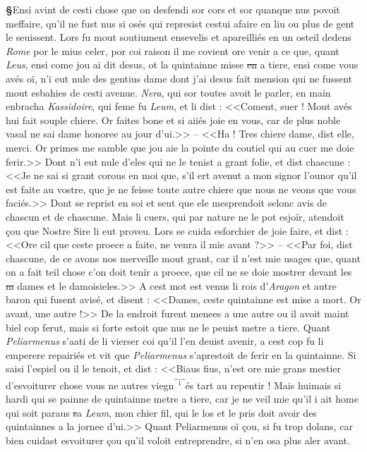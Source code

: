 \documentclass[12pt]{article} %
\newcommand{\persName}[1]{\emph{#1}} %
\newcommand{\placeName}[1]{\emph{#1}} %
\newcommand{\add}[1]{\textsuperscript{#1}}       %
\newcommand{\del}[1]{\sout{#1}}      %
\newcounter{paranum}
\newcommand{\pnum}{\stepcounter{paranum}\textbf{§\arabic{paranum}}\quad}
\begin{document}
\pnum Ensi avint de cesti chose que on desfendi sor cors et sor quanque nus povoit meffaire, qu'il ne fust nus si osés qui represist cestui afaire en liu ou plus de gent le seuissent. Lors fu mout soutiument ensevelis et apareilliés en un osteil dedens \placeName{Rome} por le mius celer, por coi raison il me covient ore venir a ce que, quant \persName{Leus}, ensi come jou ai dit desus, ot la quintainne misse \del{en} a tiere, ensi come vous avés oï, n'i eut nule des gentius dame dont j'ai desus fait mension qui ne fussent mout esbahies de cesti avenue. \persName{Nera}, qui sor toutes avoit le parler, en main enbracha \persName{Kassidoire}, qui feme fu \persName{Leum}, et li dist : <<Coment, suer ! Mout avés hui fait souple chiere. Or faites bone et si aiiés joie en vous, car de plus noble vasal ne sai dame honoree au jour d'ui.>> -- <<Ha ! Tres chiere dame, dist elle, merci. Or primes me samble que jou aie la pointe du coutiel qui au cuer me doie ferir.>> Dont n'i eut nule d'eles qui ne le tenist a grant folie, et dist chascune : <<Je ne sai si grant corous en moi que, s'il ert avenut a mon signor l'ounor qu'il est faite au vostre, que je ne feisse toute autre chiere que nous ne veons que vous faciés.>> Dont se reprist en soi et seut que ele mesprendoit selonc avis de chascun et de chascune. Mais li cuers, qui par nature ne le pot esjoïr, atendoit çou que Nostre Sire li eut proveu. Lors se cuida esforchier de joie faire, et dist : <<Ore cil que ceste proece a faite, ne venra il mie avant ?>> -- <<Par foi, dist chascune, de ce avons nos merveille mout grant, car il n'est mie usages que, quant on a fait teil chose c'on doit tenir a proece, que cil ne se doie mostrer devant les \del{m} dames et le damoisieles.>> A cest mot est venus li rois d'\placeName{Aragon} et autre baron qui fusent avisé, et disent : <<Dames, ceste quintainne est mise a mort. Or avant, une autre !>> De la endroit furent menees a une autre ou il avoit maint biel cop ferut, mais si forte estoit que nus ne le peuist metre a tiere. Quant \persName{Peliarmenus} s'aati de li vierser coi qu'il l'en deuist avenir, a cest cop fu li emperere repairiés et vit que \persName{Peliarmenus} s'aprestoit de ferir en la quintainne. Si saisi l'espiel ou il le tenoit, et dist : <<Biaus fius, n'est ore mie grans mestier d'esvoiturer chose vous ne autres viegn\add{^i^}és tart au repentir ! Mais huimais si hardi qui se painne de quintainne metre a tiere, car je ne veil mie qu'il i ait home qui soit paraus \del{s}a \persName{Leum}, mon chier fil, qui le los et le pris doit avoir des quintainnes a la jornee d'ui.>> Quant Peliarmenus oï çou, si fu trop dolans, car bien cuidast esvoiturer çou qu'il voloit entreprendre, si n'en osa plus aler avant.
\end{document}

